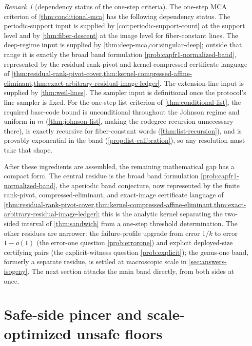 \documentclass[11pt]{article}
\theoremstyle{definition}
\theoremstyle{remark}
\newtheorem{remark}[remark]{Remark}
\begin{document}
\begin{remark}[dependency status of the one-step criteria]\label{rem:conditional-status}
The one-step MCA criterion of \cref{thm:conditional-mca} has the following dependency status.  The periodic-support input is supplied by \cref{cor:periodic-support-count} at the support level and by \cref{thm:fiber-descent} at the image level for fiber-constant lines.  The deep-regime input is supplied by \cref{thm:deep-mca,cor:singular-deep}; outside that range it is exactly the broad band formulation \cref{prob:capfr1-normalized-band}, represented by the residual rank-pivot and kernel-compressed certificate language of \cref{thm:residual-rank-pivot-cover,thm:kernel-compressed-affine-eliminant,thm:exact-arbitrary-residual-image-ledger}.  The extension-line input is supplied by \cref{thm:weil-lines}.  The sampler input is definitional once the protocol's line sampler is fixed.  For the one-step list criterion of \cref{thm:conditional-list}, the required base-code bound is unconditional throughout the Johnson regime and uniform in $m$ \textup(\cref{thm:johnson-list}, making the codegree recursion unnecessary there\textup), is exactly recursive for fiber-constant words \textup(\cref{thm:list-recursion}\textup), and is provably exponential in the band \textup(\cref{prop:list-calibration}\textup), so any resolution must take that shape.
\end{remark}

After these ingredients are assembled, the remaining mathematical gap has a compact form.  The central residue is the broad band formulation \cref{prob:capfr1-normalized-band}, the aperiodic band conjecture, now represented by the finite rank-pivot, compressed-eliminant, and exact-image certificate language of \cref{thm:residual-rank-pivot-cover,thm:kernel-compressed-affine-eliminant,thm:exact-arbitrary-residual-image-ledger}; this is the analytic kernel separating the two-sided interval of \cref{thm:sandwich} from a one-step threshold determination.  The other residues are narrower: the failure-profile upgrade from error $1/k$ to error $1-o(1)$ \textup(the error-one question \cref{prob:errorone}\textup) and explicit deployed-size certifying pairs \textup(the explicit-witness question \cref{prob:explicit}\textup); the genus-one band, formerly a separate residue, is settled at macroscopic scale in \cref{sec:answers-isogeny}.  The next section attacks the main band directly, from both sides at once.

\section{Safe-side pincer and scale-optimized unsafe floors}\label{sec:pincer}
\end{document}
